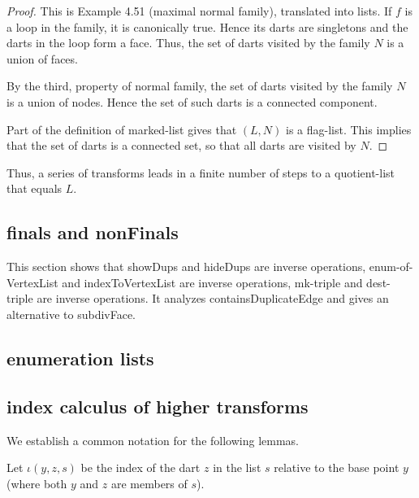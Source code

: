 \begin{proof} This is Example 4.51 (maximal normal family), translated into lists.
If $f$ is a loop in the family, it is canonically true.  Hence its
darts are singletons and the darts in the loop form a face.  Thus,
the set of darts visited by the family $N$ is a union of faces.

By the third, property of normal family, the set of darts visited by
the family $N$ is a union of nodes.  Hence the set of such darts is
a connected component. 

Part of the definition of marked-list gives that $(L,N)$ is a flag-list.  This implies
that the set of darts is a connected set,
so that all darts are visited by $N$.  
\end{proof}


Thus, a series of transforms leads in a finite number of steps to a quotient-list that equals $L$.

\subsection{finals and nonFinals}

This section shows that showDups and hideDups are inverse operations, enum-of-VertexList and indexToVertexList are inverse
operations, mk-triple and dest-triple are inverse operations.  It analyzes containsDuplicateEdge and gives
an alternative to subdivFace.

\subsection{enumeration lists}



\subsection{index calculus of higher transforms}

We establish a common notation for the following lemmas.

Let $\iota(y,z,s)$ be the index of the dart $z$ in the list $s$ relative
to the base point $y$ (where both $y$ and $z$ are members of $s$).

